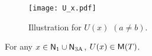   


  


  \begin{figure}[H]
    \centering
    \texttt{[image: U\_x.pdf]}
    \caption{Illustration for $U(x)$ $(a\neq b)$.}
    \label{fig:U_x}
  \end{figure}

  \begin{lemma} \label{lem:U_x}
    For any $x \in \mathsf{N}_{\mathrm{1}} \cup \mathsf{N}_{\mathrm{3A}}$, $U(x) \in \mathsf{M}(T)$.
  \end{lemma}


